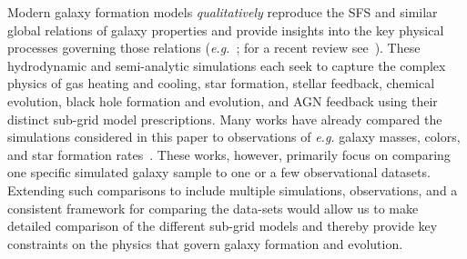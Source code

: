 \documentclass[tighten, preprint]{aastex62}
\begin{document}
{\color{red}
Modern galaxy formation models
} %
\emph{qualitatively} reproduce the SFS and 
similar global relations of galaxy properties and provide insights into the key physical processes governing those relations 
(\emph{e.g.}~\citealt{vogelsberger2014,genel2014, schaye2015, dave2017}; 
for a recent review see~\citealt{somerville2015}). These hydrodynamic and 
semi-analytic simulations each seek to capture the complex physics of 
gas heating and cooling, star formation, stellar feedback, chemical 
evolution, black hole formation and evolution, and AGN feedback using 
their distinct sub-grid model prescriptions. %
Many works have already compared the simulations considered in this paper to 
observations of \emph{e.g.} galaxy masses, colors, and star formation 
rates~\citep[\emph{e.g.}][]{vogelsberger2014, genel2014, torrey2014, sparre2015, schaye2015, bluck2016, dave2017, somerville2015}. 
These works, however, primarily focus on comparing one specific simulated 
galaxy sample to one or a few observational datasets. %
Extending such 
comparisons to include multiple simulations, observations, and a 
consistent framework for comparing the data-sets would allow us to make 
detailed comparison of the different sub-grid models and thereby provide 
key 
{\color{red} 
constraints on 
}
the physics that govern galaxy formation and evolution.  
\end{document}
